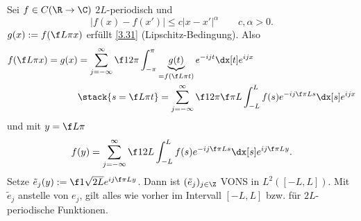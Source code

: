 \begin{nt} \label{3.35}
	Sei $f \in C(\R \to \C)$ $2L$-periodisch und
	\[
		|f(x) - f(x')| \le c |x-x'|^\alpha \qquad c,\alpha > 0.
	\]
	$g(x) := f(\f L\pi x)$ erfüllt \ref{3.31} (Lipschitz-Bedingung).
	Also
	\begin{align*}
		f(\f L\pi x) = g(x) 
		&= \sum_{j=-\infty}^\infty \f 1{2\pi} \int_{-\pi}^\pi \underbrace{g(t)}_{=f(\f L\pi t)} e^{-ijt} \dx[t] e^{ijx} \\
		&\stack{s = \f L\pi t}= \sum_{j=-\infty}^\infty \f 1{2\pi} \f \pi L \int_{-L}^L f(s) e^{-ij \f \pi L s} \dx[s] e^{ijx}
	\end{align*}
	und mit $y = \f L \pi$
	\[
		f(y) = \sum_{j=-\infty}^\infty \f 1{2L} \int_{-L}^L f(s) e^{-ij\f \pi L s} \dx[s] e^{ij \f \pi L y}.
	\]
	Setze $\tilde e_j(y) := \f 1{\sqrt{2L}} e^{ij \f \pi L y}$.
	Dann ist $(\tilde e_j)_{j\in \Z}$ VONS in $L^2([-L,L])$.
	Mit $\tilde e_j$ anstelle von $e_j$, gilt alles wie vorher im Intervall $[-L,L]$ bzw. für $2L$-periodische Funktionen.
\end{nt}

